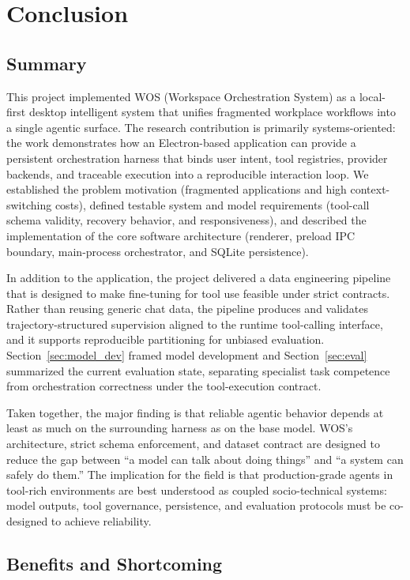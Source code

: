 \documentclass[conference]{IEEEtran}
\begin{document}
\section{Conclusion}
\subsection{Summary}
This project implemented WOS (Workspace Orchestration System) as a local-first desktop intelligent system that unifies fragmented workplace workflows into a single agentic surface. The research contribution is primarily systems-oriented: the work demonstrates how an Electron-based application can provide a persistent orchestration harness that binds user intent, tool registries, provider backends, and traceable execution into a reproducible interaction loop. We established the problem motivation (fragmented applications and high context-switching costs), defined testable system and model requirements (tool-call schema validity, recovery behavior, and responsiveness), and described the implementation of the core software architecture (renderer, preload IPC boundary, main-process orchestrator, and SQLite persistence).

In addition to the application, the project delivered a data engineering pipeline that is designed to make fine-tuning for tool use feasible under strict contracts. Rather than reusing generic chat data, the pipeline produces and validates trajectory-structured supervision aligned to the runtime tool-calling interface, and it supports reproducible partitioning for unbiased evaluation. Section~\ref{sec:model_dev} framed model development and Section~\ref{sec:eval} summarized the current evaluation state, separating specialist task competence from orchestration correctness under the tool-execution contract.

Taken together, the major finding is that reliable agentic behavior depends at least as much on the surrounding harness as on the base model. WOS’s architecture, strict schema enforcement, and dataset contract are designed to reduce the gap between “a model can talk about doing things” and “a system can safely do them.” The implication for the field is that production-grade agents in tool-rich environments are best understood as coupled socio-technical systems: model outputs, tool governance, persistence, and evaluation protocols must be co-designed to achieve reliability.

\subsection{Benefits and Shortcoming}
\end{document}

